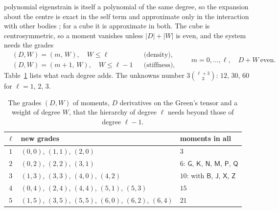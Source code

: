 \documentclass[preprint,review,12pt]{elsarticle}
\begin{document}
polynomial eigenstrain is itself a polynomial of the same degree, so the expansion about the centre is
exact in the self term and approximate only in the interaction with other bodies \citep{Brisard2014};
for a cube it is approximate in both. The cube is centrosymmetric, so a moment vanishes unless $|D|+|W|$ is even, and the system
needs the grades
\begin{equation}\label{eq:grades}
\begin{aligned}
  &(D,W)=(m,\,W),\quad W\le\ell &&\text{(density)},\\
  &(D,W)=(m+1,\,W),\quad W\le\ell-1 &&\text{(stiffness)},
\end{aligned}
  \qquad m=0,\dots,\ell,\quad D+W\ \text{even}.
\end{equation}
Table~\ref{tab:grades} lists what each degree adds. The unknowns number
$3\binom{\ell+3}{3}$: $12$, $30$, $60$ for $\ell=1$, $2$, $3$.
\begin{table}[htbp]
\centering
\caption{The grades $(D,W)$ of moments, $D$ derivatives on the Green's tensor and a weight of degree
$W$, that the hierarchy of degree $\ell$ needs beyond those of degree $\ell-1$.}\label{tab:grades}
\small
\begin{tabular}{@{}cll@{}}
\toprule
$\ell$ & new grades & moments in all \\
\midrule
$1$ & $(0,0)$, $(1,1)$, $(2,0)$ & $3$ \\
$2$ & $(0,2)$, $(2,2)$, $(3,1)$ & $6$: $\mathsf G$, $\mathsf K$, $\mathsf N$, $\mathsf M$, $\mathsf P$, $\mathsf Q$ \\
$3$ & $(1,3)$, $(3,3)$, $(4,0)$, $(4,2)$ & $10$: with $\mathsf B$, $\mathsf J$, $\mathsf X$, $\mathsf Z$ \\
$4$ & $(0,4)$, $(2,4)$, $(4,4)$, $(5,1)$, $(5,3)$ & $15$ \\
$5$ & $(1,5)$, $(3,5)$, $(5,5)$, $(6,0)$, $(6,2)$, $(6,4)$ & $21$ \\
\bottomrule
\end{tabular}
\end{table}
\end{document}
